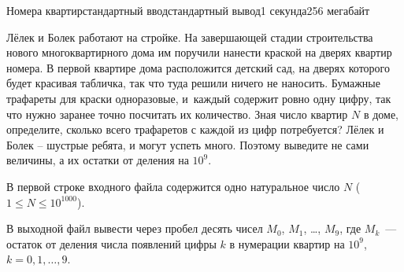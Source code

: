 \begin{problem}{Номера квартир}{стандартный ввод}{стандартный вывод}{1 секунда}{256 мегабайт}

Лёлек и Болек работают на стройке. На завершающей стадии строительства нового многоквартирного дома им поручили нанести краской на дверях квартир номера. В первой квартире дома расположится детский сад, на дверях которого будет красивая табличка, так что туда решили ничего не наносить. Бумажные трафареты для краски одноразовые, и~каждый содержит ровно одну цифру, так что нужно заранее точно посчитать их количество. Зная число квартир $N$ в доме, определите, сколько всего трафаретов с каждой из цифр потребуется? Лёлек и Болек -- шустрые ребята, и могут успеть много. Поэтому выведите не сами величины, а их остатки от деления на $10^9$.

\InputFile
В первой строке входного файла содержится одно натуральное число $N$ ($1 \leq N \leq 10^{1000}$).

\OutputFile
В выходной файл вывести через пробел десять чисел $M_0$, $M_1$, \dots, $M_9$, где $M_k$~--- остаток от деления числа появлений цифры $k$ в нумерации квартир на
$10^9$, $k = 0, 1, \ldots , 9$.

\Example

\begin{example}
%
\end{example}

\end{problem}

